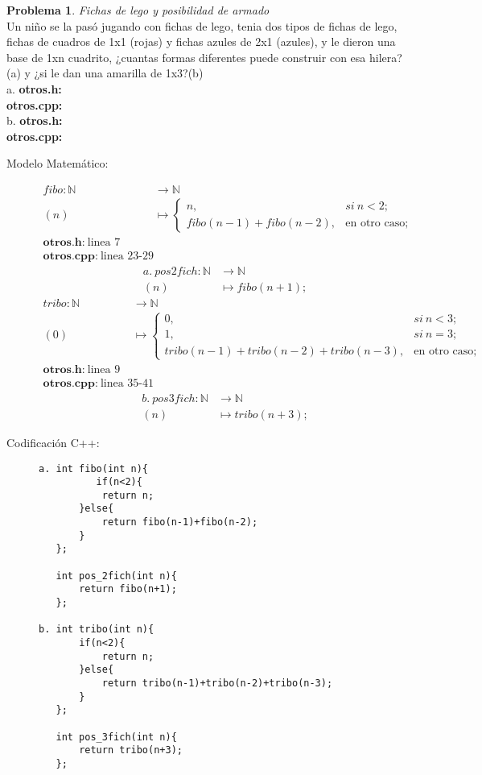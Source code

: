 \documentclass{article}
\theoremstyle{plain}
\theoremstyle{definition}
\newtheorem{problem}{Problema}
\begin{document}
\begin{problem} \emph{Fichas de lego y posibilidad de armado}\\
Un niño se la pasó jugando con fichas de lego, tenia dos tipos de fichas de lego, fichas de cuadros de 1x1 (rojas) y fichas azules de 2x1 (azules), y le dieron una base de 1xn cuadrito, ¿cuantas formas diferentes puede construir con esa hilera?(a) y ¿si le dan una amarilla de 1x3?(b)\\
a. \textbf{otros.h:}\ \\
   \textbf{otros.cpp:}\ \\
b. \textbf{otros.h:}\ \\
   \textbf{otros.cpp:}\ 
%
\begin{description}
\item[Modelo Matemático:]
%
\begin{align*}
fibo: \mathbb{N} &\to \mathbb{N}\\
(n) &\mapsto
\begin{cases}
n,& si\ n < 2;\\
fibo(n-1)+fibo(n-2),& \text{en otro caso;}
\end{cases}\\
\textbf{otros.h:}\ \text{linea 7}\\
\textbf{otros.cpp:}\ \text{linea 23-29}
\end{align*}
\begin{align*}
a.\ pos 2 fich: \mathbb{N} &\to \mathbb{N}\\
(n) &\mapsto fibo(n+1);
\end{align*}
\begin{align*}
tribo: \mathbb{N} &\to \mathbb{N}\\
(0) &\mapsto
\begin{cases}
0,& si\ n < 3;\\
1,& si\ n = 3;\\
tribo(n-1)+tribo(n-2)+tribo(n-3),& \text{en otro caso;}
\end{cases}\\
\textbf{otros.h:}\ \text{linea 9}\\
\textbf{otros.cpp:}\ \text{linea 35-41}
\end{align*}
\begin{align*}
b.\ pos 3 fich: \mathbb{N} &\to \mathbb{N}\\
(n) &\mapsto tribo(n+3);
\end{align*}
%
\item[Codificación \textsf{C++}:]\hfill
%
\begin{verbatim}
a. int fibo(int n){
          if(n<2){
           return n;
       }else{
           return fibo(n-1)+fibo(n-2);
       }
   };

   int pos_2fich(int n){
       return fibo(n+1);
   };

b. int tribo(int n){
       if(n<2){
           return n;
       }else{
           return tribo(n-1)+tribo(n-2)+tribo(n-3);
       }
   };

   int pos_3fich(int n){
       return tribo(n+3);
   }; 
\end{verbatim}
\end{description}
\end{problem}
\end{document}
